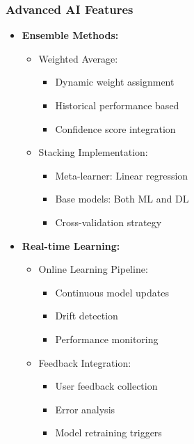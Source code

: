 \documentclass[12pt,a4paper]{report}
\begin{document}
\subsubsection{Advanced AI Features}
\begin{itemize}
    \item \textbf{Ensemble Methods:}
    \begin{itemize}
        \item Weighted Average:
        \begin{itemize}
            \item Dynamic weight assignment
            \item Historical performance based
            \item Confidence score integration
        \end{itemize}
        
        \item Stacking Implementation:
        \begin{itemize}
            \item Meta-learner: Linear regression
            \item Base models: Both ML and DL
            \item Cross-validation strategy
        \end{itemize}
    \end{itemize}

    \item \textbf{Real-time Learning:}
    \begin{itemize}
        \item Online Learning Pipeline:
        \begin{itemize}
            \item Continuous model updates
            \item Drift detection
            \item Performance monitoring
        \end{itemize}
        
        \item Feedback Integration:
        \begin{itemize}
            \item User feedback collection
            \item Error analysis
            \item Model retraining triggers
        \end{itemize}
    \end{itemize}
\end{itemize}
\end{document}
